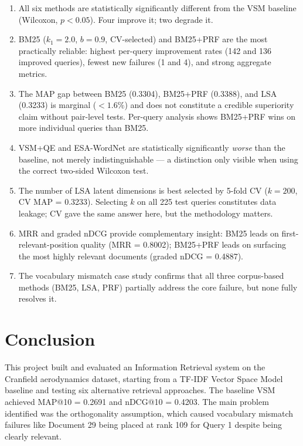 \documentclass{svproc}
\begin{document}
    \begin{enumerate}[noitemsep]
        \item All six methods are statistically significantly different from the VSM baseline (Wilcoxon, $p < 0.05$). Four improve it; two degrade it.
        \item BM25 ($k_1{=}2.0$, $b{=}0.9$, CV-selected) and BM25+PRF are the most practically reliable: highest per-query improvement rates (142 and 136 improved queries), fewest new failures (1 and 4), and strong aggregate metrics.
        \item The MAP gap between BM25 (0.3304), BM25+PRF (0.3388), and LSA (0.3233) is marginal ($<1.6\%$) and does not constitute a credible superiority claim without pair-level tests. Per-query analysis shows BM25+PRF wins on more individual queries than BM25.
        \item VSM+QE and ESA-WordNet are statistically significantly \emph{worse} than the baseline, not merely indistinguishable — a distinction only visible when using the correct two-sided Wilcoxon test.
        \item The number of LSA latent dimensions is best selected by 5-fold CV ($k{=}200$, CV MAP = 0.3233). Selecting $k$ on all 225 test queries constitutes data leakage; CV gave the same answer here, but the methodology matters.
        \item MRR and graded nDCG provide complementary insight: BM25 leads on first-relevant-position quality (MRR = 0.8002); BM25+PRF leads on surfacing the most highly relevant documents (graded nDCG = 0.4887).
        \item The vocabulary mismatch case study confirms that all three corpus-based methods (BM25, LSA, PRF) partially address the core failure, but none fully resolves it.
    \end{enumerate}

    \FloatBarrier
    \section{Conclusion}

    This project built and evaluated an Information Retrieval system on the Cranfield aerodynamics dataset, starting from a TF-IDF Vector Space Model baseline and testing six alternative retrieval approaches. The baseline VSM achieved MAP@10 = 0.2691 and nDCG@10 = 0.4203. The main problem identified was the orthogonality assumption, which caused vocabulary mismatch failures like Document 29 being placed at rank 109 for Query 1 despite being clearly relevant.
\end{document}
